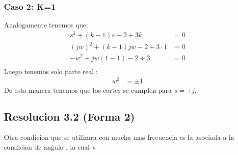 \documentclass[
  11pt,
  letterpaper,
   addpoints,
  ]{exam}
\begin{document}
\begin{questions}
\begin{solution}
\subsubsection*{Caso 2: K=1}
Analogamente tenemos que:
\begin{align}
    s^{2}+(k-1)s-2+3k &= 0\\
    (jw)^{2}+(k-1)jw-2+3\cdot 1 &= 0\\
    -w^{2}+jw(1-1) -2+3 &= 0\\
\end{align}
Luego tenemos solo parte real,:
\begin{align}
    w^{2} &= \pm 1
\end{align}
De esta manera tenemos que los cortes se cumplen para $s= \pm j$.
\subsection*{Resolucion 3.2 (Forma 2)} 
Otra condicion que se utilizara con mucha mas frecuencia es la asociada a la condicion de angulo , la cual v
\end{solution}

\end{questions}
\newpage
\end{document}
